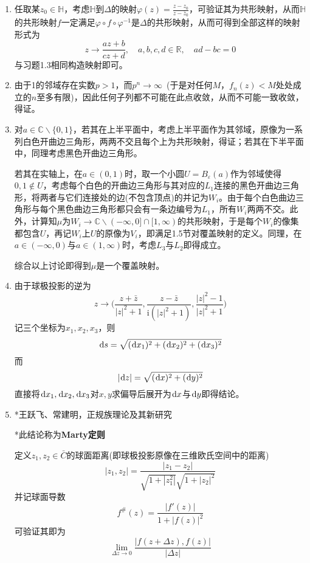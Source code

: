 \documentclass[a4paper,UTF8,fontset=windows,10pt]{ctexart}
\newcommand*{\ir}{\mathrm{i}}
\newcommand*{\dr}{\hspace{0.07em}\mathrm{d}}
\begin{document}
\begin{enumerate}
    \item 任取某$z_0\in\mathbb{H}$，考虑$\mathbb{H}$到$\Delta$的映射$\varphi(z)=\frac{z-z_0}{z-\bar{z}_0}$，可验证其为共形映射，从而$\mathbb{H}$的共形映射$f$一定满足$\varphi\circ f\circ\varphi^{-1}$是$\Delta$的共形映射，从而可得到全部这样的映射形式为
    $$z\to\frac{az+b}{cz+d},\quad a,b,c,d\in\mathbb{R},\quad ad-bc=0$$
    与习题1.3相同构造映射即可。

    \item
    由于1的邻域存在实数$p>1$，而$p^n\to\infty$\ (于是对任何$M$，$f_n(z)<M$处处成立的$n$至多有限)，因此任何子列都不可能在此点收敛，从而不可能一致收敛，得证。

    \item 对$a\in\mathbb{C}\backslash\{0,1\}$，若其在上半平面中，考虑上半平面作为其邻域，原像为一系列白色开曲边三角形，两两不交且每个上为共形映射，得证；若其在下半平面中，同理考虑黑色开曲边三角形。
    
    若其在实轴上，在$a\in(0,1)$时，取一个小圆$U=B_\varepsilon(a)$作为邻域使得$0,1\notin U$，考虑每个白色的开曲边三角形与其对应的$L_1$连接的黑色开曲边三角形，将两者与它们连接处的边(不包含顶点)的并记为$W_i$。由于每个白色曲边三角形与每个黑色曲边三角形都只会有一条边编号为$L_1$，所有$W_i$两两不交。此外，计算知$\mu$为$W_i\to\mathbb{C}\backslash(-\infty,0]\cap[1,\infty)$的共形映射，于是每个$W_i$的像集都包含$U$，再记$W_i$上$U$的原像为$V_i$，即满足1.5节对覆盖映射的定义。同理，在$a\in(-\infty,0)$与$a\in(1,\infty)$时，考虑$L_3$与$L_2$即得成立。

    综合以上讨论即得到$\mu$是一个覆盖映射。

    \item 由于球极投影的逆为
    $$z\to\bigg(\frac{z+\bar{z}}{|z|^2+1},\frac{z-\bar{z}}{\ir(|z|^2+1)},\frac{|z|^2-1}{|z|^2+1}\bigg)$$
    记三个坐标为$x_1,x_2,x_3$，则
    $$\dr s=\sqrt{(\dr x_1)^2+(\dr x_2)^2+(\dr x_3)^2}$$
    而
    $$|\dr z|=\sqrt{(\dr x)^2+(\dr y)^2}$$
    直接将$\dr x_1,\dr x_2,\dr x_3$对$x,y$求偏导后展开为$\dr x$与$\dr y$即得结论。

    \item *王跃飞、常建明，正规族理论及其新研究
    
    *此结论称为\textbf{Marty定则}
    
    定义$z_1,z_2\in\bar{C}$的球面距离(即球极投影原像在三维欧氏空间中的距离)
    $$|z_1,z_2|=\frac{|z_1-z_2|}{\sqrt{1+|z_1^2|}\sqrt{1+|z_2|^2}}$$
    并记球面导数
    $$f^\#(z)=\frac{|f'(z)|}{1+|f(z)|^2}$$
    可验证其即为
    $$\lim_{\Delta z\to0}\frac{|f(z+\Delta z),f(z)|}{|\Delta z|}$$


\end{enumerate}
\end{document}
